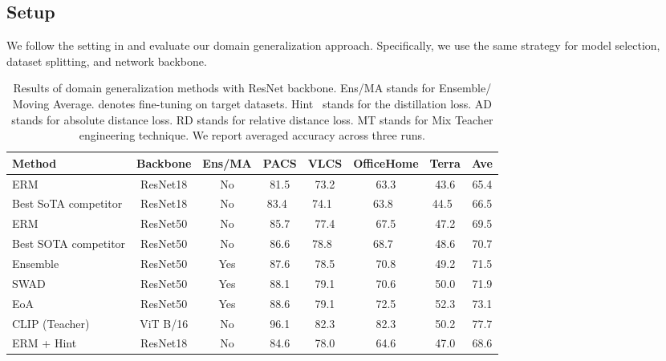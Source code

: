 \documentclass[10pt,twocolumn,letterpaper]{article}
\begin{document}
\subsection{Setup}
We follow the setting in \cite{gulrajani2020search, ye2021ood} and evaluate our domain generalization approach. Specifically, we use the same strategy for model selection, dataset splitting, and network backbone. 








\begin{table*}[h]
\caption{Results of domain generalization methods with ResNet backbone. Ens/MA stands for Ensemble/ Moving Average.  denotes fine-tuning on target datasets. Hint~\cite{hinton2015distilling} stands for the distillation loss. AD stands for absolute distance loss. RD stands for relative distance loss. MT stands for Mix Teacher engineering technique. We report averaged accuracy across three runs.} 
\vspace{5pt}
\label{table:DGmethods} 
\footnotesize
\centering 
\begin{tabular}{l|c | c | c c c c | c} 
\hline 
Method& Backbone & Ens/MA & PACS & VLCS & OfficeHome & Terra  & Ave\\ [0.5ex] 
\hline \hline
ERM  \cite{ye2022ood}& ResNet18 & No & 81.5 & 73.2 & 63.3 & 43.6  & 65.4\\
Best SoTA competitor& ResNet18 &No & 83.4~\cite{huang2022two} & 74.1~\cite{huang2022two} & 63.8~\cite{li2018domain} & 44.5~\cite{huang2022two} & 66.5  \\
\hline
ERM ~\cite{gulrajani2020search}& ResNet50 & No & 85.7 & 77.4 & 67.5 & 47.2  &69.5 \\ 
Best SOTA competitor & ResNet50 & No & 86.6 \cite{seo2020learning}& 78.8~\cite{sun2016deep} & 68.7~\cite{sun2016deep} & 48.6 \cite{nam2021reducing} & 70.7\\
\hline
Ensemble \cite{arpit2021ensemble}& ResNet50 & Yes & 87.6 & 78.5 & 70.8 & 49.2 & 71.5 \\
SWAD \cite{cha2021swad} & ResNet50 & Yes & 88.1 & 79.1 & 70.6 & 50.0 & 71.9 \\
EoA \cite{arpit2021ensemble} & ResNet50  & Yes & 88.6  & 79.1 & 72.5 & 52.3 & 73.1 \\
\hline \hline
CLIP \cite{zhang2021domain} (Teacher) & ViT B/16 & No &  96.1 & 82.3 & 82.3 & 50.2 & 77.7  \\
\hline
ERM + Hint & ResNet18 & No & 84.6 & 78.0 & 64.6 & 47.0 & 68.6 \\

\end{tabular}
\end{table*}
\end{document}
